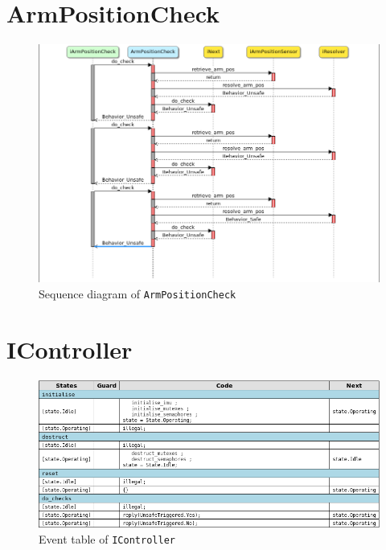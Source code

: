 \documentclass[12pt]{scrreprt}
\begin{document}
\begin{appendices}
\section{ArmPositionCheck}
\label{aArmPositionCheck}

\begin{figure}[H]
    \centering
    \includegraphics[width=\textwidth]{Figures/results/modelling_figures/ArmPositionCheck/ArmPositionCheck_seq.png}
    \caption{Sequence diagram of \texttt{ArmPositionCheck}}
    \label{fig:ArmPositionCheck_seq}
\end{figure}

\section{IController}
\label{IController}

\begin{figure}[H]
    \centering
    \includegraphics[width=\textwidth]{Figures/results/modelling_figures/IController/IController_event_table.png}
    \caption{Event table of \texttt{IController}}
    \label{fig:IController_event_table}
\end{figure}


\end{appendices}
\end{document}

